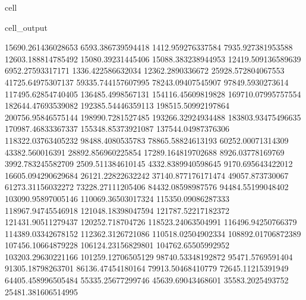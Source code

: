 \documentclass[letterpaper,10pt,english]{jupyterBook}
\begin{document}
\begin{sphinxuseclass}{cell}
\begin{sphinxVerbatimOutput}
\begin{sphinxuseclass}{cell_output}
\begin{sphinxVerbatim}[commandchars=\\\{\}]
15690.261436028653  6593.386739594418  \PYGZhy{}1412.959276337584  \PYGZhy{}7935.927381953588  \PYGZhy{}12603.188814785492  \PYGZhy{}15080.39231445406  \PYGZhy{}15088.383238944953  \PYGZhy{}12419.509136589639  \PYGZhy{}6952.27593317171  1336.422586632034  12362.2890336672  25928.572804067553  41725.64975307137  59335.744157607995  78243.09407545907  97849.5930273614  117495.62854740405  136485.4998567131  154116.45609819828  169710.07995757554  182644.47693539082  192385.54446359113  198515.50992197864  200756.95846575144  198990.7281527485  193266.32924934488  183803.93475496635  170987.46833367337  155348.85373921087  137544.04987376306  118322.03763405232  98488.4080535783  78865.58824613193  60252.00071314309  43382.560016391  28892.856960225854  17289.164819702688  8926.03778169769  3992.783245582709  2509.511384610145  4332.8389940598645  9170.695643422012  16605.094290629684  26121.22822632242  37140.877176171474  49057.873730067  61273.31156032272  73228.27111205406  84432.08598987576  94484.55199048402  103090.95897005146  110069.36503017324  115350.09086287333  118967.94745546918  121048.18398047594  121787.52217182372  121431.90511279437  120252.718704726  118523.24063504991  116496.94250766379  114389.03342678152  112362.3126721086  110518.02504902334  108892.01706872389  107456.10664879228  106124.23156829801  104762.65505992952  103203.29630221166  101259.12706505129  98740.53348192872  95471.5769591404  91305.18798263701  86136.47454180164  79913.50468410779  72645.11215391949  64405.458996505484  55335.25677299746  45639.69043468601  35583.2025493752  25481.381606514995  

\end{sphinxVerbatim}
\end{sphinxuseclass}
\end{sphinxVerbatimOutput}
\end{sphinxuseclass}
\end{document}
